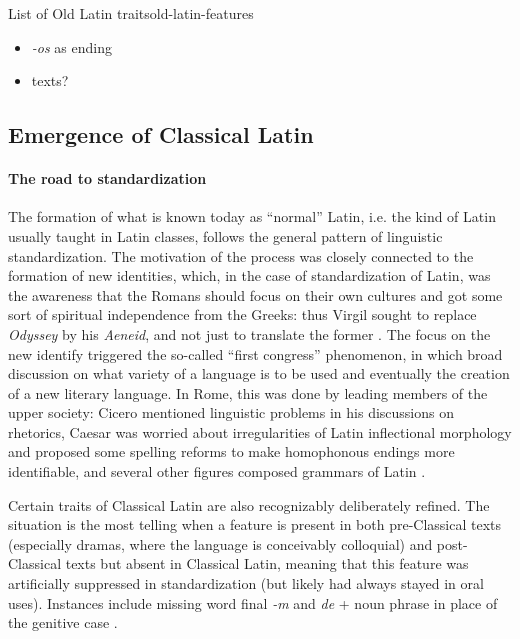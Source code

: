 \documentclass[a4paper, oneside, 12pt]{report}
\newcommand*{\citesec}[1]{\S~{#1}}
\newcommand*{\citepage}[1]{p.~{#1}}
\newcommand*{\citepages}[1]{pp.~{#1}}
\newcommand{\form}[1]{\emph{#1}}
\newcommand{\literature}[1]{\textit{#1}}
\begin{document}
\begin{todobox}{List of Old Latin traits}{old-latin-features}
    \begin{itemize}
        \item \form{-os} as ending
        \item texts?
    \end{itemize}
\end{todobox}

\subsection{Emergence of Classical Latin}

\paragraph*{The road to standardization}\label{sec:introduction.history.classical.standard}
The formation of what is known today as ``normal'' Latin,
i.e. the kind of Latin usually taught in Latin classes,
follows the general pattern of linguistic standardization.
The motivation of the process was closely connected to the formation of new identities,
which, in the case of standardization of Latin,
was the awareness that the Romans should focus on their own cultures
and got some sort of spiritual independence from the Greeks:
thus Virgil sought to replace \literature{Odyssey} by his \literature{Aeneid},
and not just to translate the former
\citep[\citepage{66}]{leonhardt2013latin}.
The focus on the new identify triggered the so-called ``first congress'' phenomenon,
in which broad discussion on what variety of a language is to be used
and eventually the creation of a new literary language.
In Rome, this was done by leading members of the upper society:
Cicero mentioned linguistic problems in his discussions on rhetorics,
Caesar was worried about irregularities of Latin inflectional morphology
and proposed some spelling reforms to make homophonous endings more identifiable,
and several other figures composed grammars of Latin
\citep[\citepages{60-61}]{leonhardt2013latin}.

Certain traits of Classical Latin are also recognizably deliberately refined.
The situation is the most telling when a feature is present in 
both pre-Classical texts (especially dramas, where the language is conceivably colloquial) 
and post-Classical texts but absent in Classical Latin,
meaning that this feature was artificially suppressed in standardization
(but likely had always stayed in oral uses).
Instances include missing word final \form{-m}
and \form{de} + noun phrase in place of the genitive case
\citep[\citesec{2.4.4}, \citesec{8.3.1}]{alkire2010romance}.
\end{document}
